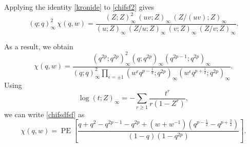 \documentclass[a4paper,11pt]{article}
\theoremstyle{definition}
\theoremstyle{definition}
\theoremstyle{remark}
\newcommand{\be}{\begin{equation}}
\newcommand{\ee}{\end{equation}}
\begin{document}
Applying the identity \eqref{kronide} to  \eqref{chifsf2} gives  
\be
(q;q)_\infty^2 \, \chi(q,w) = \frac{(Z;Z)_\infty^2 \, (uv;Z)_\infty \, (Z/(uv);Z)_\infty}{(u;Z)_\infty \, (Z/u;Z)_\infty \, (v;Z)_\infty \, (Z/v;Z)_\infty}.
\ee
 

As a result, we obtain
\begin{equation} \label{chifsdfsf}
\chi (q,w)=
\frac{(q^{2p};q^{2p})_\infty^2
      (q;q^{2p})_\infty(q^{2p-1};q^{2p})_\infty}
 {(q;q)_\infty^2
  \displaystyle\prod_{\epsilon=\pm1}
    (w^\epsilon q^{p-\frac12};q^{2p})_\infty
    (w^\epsilon q^{p+\frac12};q^{2p})_\infty}.
\end{equation}
Using
\be
\log(t;Z)_\infty
=-\sum_{r\geq1}\frac{t^r}{r(1-Z^r)},
\ee
we can write \eqref{chifsdfsf} as 
\begin{equation}  
\chi (q,w)
=
\operatorname{PE}\!\left[
\frac{
 q+q^2-q^{2p-1}-q^{2p}
 +(w+w^{-1})(q^{p-\frac12}-q^{p+\frac32})
}{
 (1-q)(1-q^{2p})
}
\right].
\end{equation}
 
    
 
  
 
 
  
\end{document}
